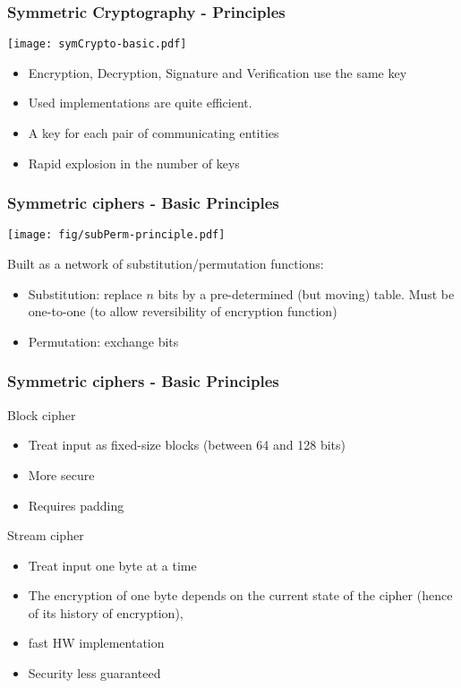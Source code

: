 \documentclass[
hyperref={pdfpagelabels=false}
,xcolor=table
]
{beamer}
\newcommand{\plus}{{\texttt{[image: plus.png]}}}
\newcommand{\minus}{{\texttt{[image: minus.png]}}}
\begin{document}
\begin{frame}
  \frametitle{Symmetric Cryptography - Principles}

  \begin{center}
    \texttt{[image: symCrypto-basic.pdf]}
  \end{center}

  \begin{itemize}
  \item Encryption, Decryption, Signature and Verification use the same key
  \item Used implementations are quite efficient. 
  \item A key for each pair of communicating entities
  \item[$\Rightarrow$] Rapid explosion in the number of keys
  \end{itemize}
\end{frame}


\begin{frame}
  \frametitle{Symmetric ciphers - Basic Principles}

  \begin{center}
    \texttt{[image: fig/subPerm-principle.pdf]}
  \end{center}
  
  Built as a network of substitution/permutation functions:
  \begin{itemize}
  \item Substitution: replace $n$ bits by a pre-determined (but moving) table. Must be one-to-one (to allow reversibility of encryption function)
  \item Permutation: exchange bits
  \end{itemize}
 
\end{frame}

\begin{frame}
  \frametitle{Symmetric ciphers - Basic Principles}

  \begin{block}{Block cipher}
    \begin{itemize}
    \item Treat input as fixed-size blocks (between 64 and 128 bits)
    \item[\plus] More secure
    \item[\minus] Requires padding
    \end{itemize}
  \end{block}


  \begin{block}{Stream cipher}
    \begin{itemize}
    \item Treat input one byte at a time
    \item The encryption of one byte depends on the current state of the cipher (hence of its history of encryption), 
    \item[\plus] fast HW implementation
    \item[\minus] Security less guaranteed
    \end{itemize}
  \end{block}
\end{frame}
\end{document}

